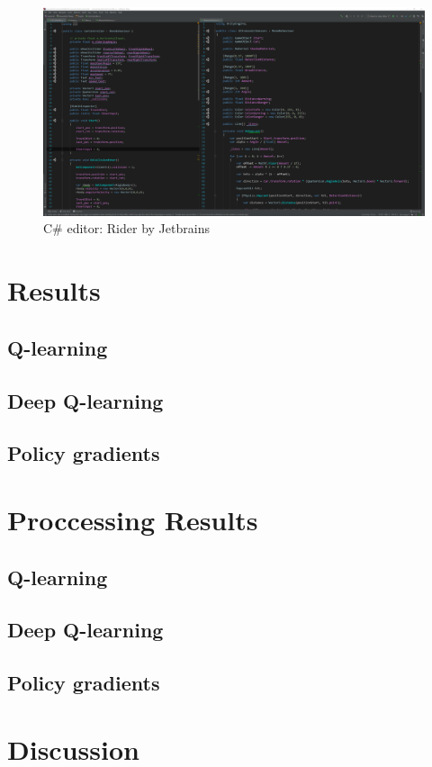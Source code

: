 \documentclass{article}
\begin{document}
\begin{figure}
\includegraphics[width=\linewidth]{csharp}
\caption{C\# editor: Rider by Jetbrains}
\end{figure}


\section{Results}
\subsection{Q-learning}
\subsection{Deep Q-learning}
\subsection{Policy gradients}

\section{Proccessing Results}
\subsection{Q-learning}
\subsection{Deep Q-learning}
\subsection{Policy gradients}

\section{Discussion}
\end{document}
